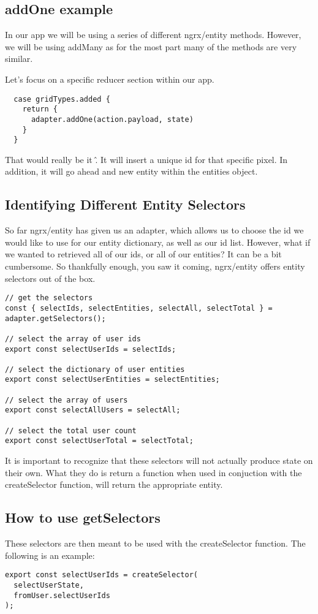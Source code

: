\subsection{ addOne example }
In our app we will be using a series of different ngrx/entity methods. However,
we will be using addMany as for the most part many of the methods are very
similar.

Let's focus on a specific reducer section within our app.
\begin{verbatim}
  case gridTypes.added {
    return {
      adapter.addOne(action.payload, state)
    }
  }
\end{verbatim}

That would really be it \^. It will insert a unique id for that specific pixel.
In addition, it will go ahead and new entity within the entities object.

\subsection{ Identifying Different Entity Selectors }
So far ngrx/entity has given us an adapter, which allows us to choose the id
we would like to use for our entity dictionary, as well as our id list. However,
what if we wanted to retrieved all of our ids, or all of our entities? It can
be a bit cumbersome. So thankfully enough, you saw it coming, ngrx/entity
offers entity selectors out of the box.

\begin{lstlisting}
// get the selectors
const { selectIds, selectEntities, selectAll, selectTotal } = adapter.getSelectors();

// select the array of user ids
export const selectUserIds = selectIds;

// select the dictionary of user entities
export const selectUserEntities = selectEntities;

// select the array of users
export const selectAllUsers = selectAll;

// select the total user count
export const selectUserTotal = selectTotal;
\end{lstlisting}

It is important to recognize that these selectors will not actually produce
state on their own. What they do is return a function when used in
conjuction with the createSelector function, will return the appropriate
entity.

\subsection{ How to use getSelectors }
These selectors are then meant to be used with the createSelector function.
The following is an example:
\begin{verbatim}
export const selectUserIds = createSelector(
  selectUserState,
  fromUser.selectUserIds
);
\end{verbatim}


